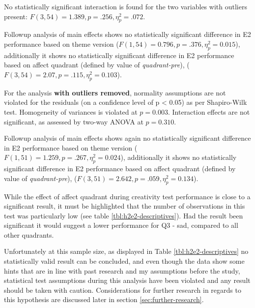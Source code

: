 	No statistically significant interaction is found for the two variables with outliers present: $ F (3, 54) = 1.389, p = .256, \eta_{p}^{2} = .072 $.
	
	Followup analysis of main effects shows 
	no statistically significant difference in E2 performance based on theme version ($ F(1, 54) = 0.796, p = .376, \eta_{p}^{2} = 0.015 $), additionally it shows no statistically significant difference in E2 performance based on affect quadrant (defined by value of \textit{quadrant-pre}), ($ F(3, 54) = 2.07, p = .115, \eta_{p}^{2} = 0.103 $).
	
	For the analysis \textbf{with outliers removed},
	normality assumptions are not violated for the residuals (on a confidence level of p < 0.05) as per Shapiro-Wilk test. Homogeneity of variances is violated at $ p = 0.003 $. Interaction effects are not significant, as assessed by two-way ANOVA at $ p = 0.310 $. 
	
	Followup analysis of main effects shows again
	no statistically significant difference in E2 performance based on theme version ($ F(1, 51) = 1.259, p = .267, \eta_{p}^{2} = 0.024 $), additionally it shows no statistically significant difference in E2 performance based on affect quadrant (defined by value of \textit{quadrant-pre}), ($ F(3, 51) = 2.642, p = .059, \eta_{p}^{2} = 0.134 $).
	
	While the effect of affect quadrant during creativity test performance is close to a significant result, it must be highlighted that the number of observations in this test was particularly low (see table \ref{tbl:h2e2-descriptives}). Had the result been significant it would suggest a lower performance for Q3 - sad, compared to all other quadrants.
	
	
	Unfortunately at this sample size, as displayed in Table \ref{tbl:h2e2-descriptives} no statistically valid result can be concluded, and even though the data show some hints that are in line with past research and my assumptions before the study, statistical test assumptions during this analysis have been violated and any result should be taken with caution. Considerations for further research in regards to this hypothesis are discussed later in section \ref{sec:further-research}.
	
